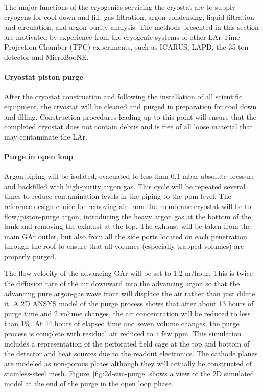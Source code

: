 The major functions of the cryogenics servicing the cryostat are to supply cryogens for cool down and fill, gas filtration, argon condensing, liquid filtration and circulation, and argon-purity analysis. The methods presented in this section are motivated by experience from the cryogenic systems of other LAr Time Projection Chamber (TPC) experiments, such as ICARUS, LAPD, the 35 ton detector and MicroBooNE.

\paragraph{Cryostat piston purge}
%
After the cryostat construction and following the installation of all scientific equipment, the cryostat will be cleaned and purged in preparation for cool down and filling. Construction procedures leading up to this point will ensure that the completed cryostat does not contain debris and is free of all loose material that may contaminate the LAr.

\paragraph{Purge in open loop}
%
Argon piping will be isolated, evacuated to less than 0.1 mbar  absolute pressure and backfilled with high-purity argon gas. This cycle will be repeated several times to reduce contamination levels in the piping to the ppm level. The reference-design choice for removing air from the membrane cryostat will be to flow/piston-purge argon, introducing the heavy argon gas at the bottom of the tank and removing the exhaust at the top. The exhaust will be taken from the main GAr outlet, but also from all the side ports located on each penetration through the roof to ensure that all volumes (especially trapped volumes) are properly purged.

The flow velocity of the advancing GAr will be set to 1.2 m/hour. This is twice the diffusion rate of the air downward into the advancing argon so that the advancing pure argon-gas wave front will displace the air rather than just dilute it. A 2D ANSYS model of the purge process shows that after about 13 hours of purge time and 2 volume changes, the air concentration will be reduced to less than 1\%. At 44 hours of elapsed time and seven volume changes, the purge process is complete with residual air reduced to a few ppm. This simulation includes a representation of the perforated field cage at the top and bottom of the detector and heat sources due to the readout electronics. The cathode planes are modeled as non-porous plates although they will actually be constructed of stainless-steel mesh. Figure~\ref{fig:2d-sim-purge} shows a view of the 2D simulated model at the end of the purge in the open loop phase.

